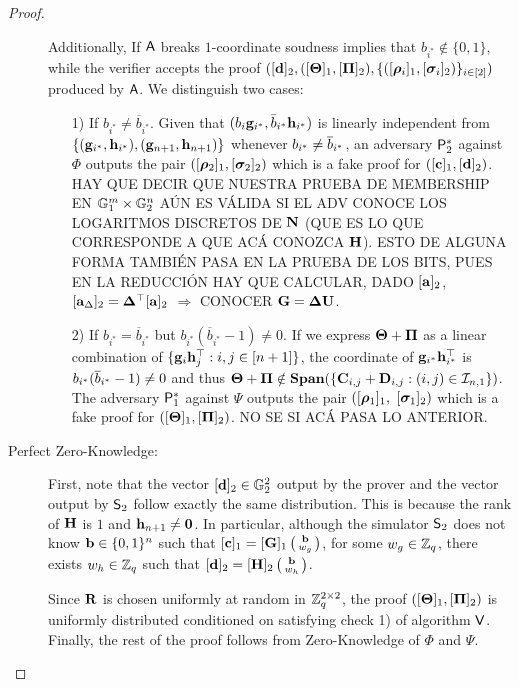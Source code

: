 \begin{proof}
\begin{description}
Additionally, If $\mathsf{A}$ breaks $1$-coordinate soudness implies that $b_{i^*} \notin \{0,1\}$,
while the verifier accepts the proof
$ (
        [\mathbf{d}]_2,
        ([\mathbf{{\Theta}}]_1, [\mathbf{{\Pi}}]_2), 
        \{([{\boldsymbol \rho}_{i}]_1, [{\boldsymbol \sigma}_{i}]_2)\}_{i \in [2]} )$
  produced by $\mathsf{A}$.
We distinguish two cases:
\begin{itemize}
\item[1)] If $b_{i^*} \neq \overline{b}_{i^*}$. Given that $(b_{i}\mathbf{g}_{i^*},\bar{b}_{i^*}\mathbf{h}_{i^*})$ is linearly independent from $\{(\mathbf{g}_{i^*},\mathbf{h}_{i^*}),(\mathbf{g}_{n+1},\mathbf{h}_{n+1})\}$
whenever $b_{i^*}\neq\overline{b}_{i^*}$, an adversary
$\mathsf{P}^*_2$ against $\Phi$
outputs the pair $([{\boldsymbol \rho}_{2}]_1,[{\boldsymbol \sigma}_{2}]_2)
$ which is a fake proof for 
$([\mathbf{c}]_1,[\mathbf{d}]_2)$.
{\color{red} HAY QUE DECIR QUE NUESTRA PRUEBA DE MEMBERSHIP EN $\mathbb{G}_1^m\times\mathbb{G}_2^n$ A\'UN ES V\'ALIDA SI EL ADV CONOCE LOS LOGARITMOS DISCRETOS DE $\mathbf{{N}}$ (QUE ES LO QUE CORRESPONDE A QUE AC\'A CONOZCA $\mathbf{{H}}$). ESTO DE ALGUNA FORMA TAMBI\'EN PASA EN LA PRUEBA DE LOS BITS, PUES EN LA REDUCCI\'ON HAY QUE CALCULAR, DADO $[\mathbf{a}]_2$, $[\mathbf{a}_\Delta]_2=\mathbf{{\Delta}}^\top[\mathbf{a}]_2$ $\Rightarrow$ CONOCER $\mathbf{{G}}=\mathbf{{\Delta}}\mathbf{{U}}$.}
\item[2)] If $b_{i^*} = \overline{b}_{i^*}$ but 
$b_{i^*}(\overline{b}_{i^*} -1) \neq 0$.
If we express $\mathbf{{\Theta}}+\mathbf{{\Pi}}$
as a linear combination of $\{\mathbf{g}_{i}\mathbf{h}_{j}^{\top}:i,j\in[n+1]\}$, the coordinate of
$\mathbf{g}_{i^*}\mathbf{h}_{i^*}^\top$ is $b_{i^*}(\overline{b}_{i^*}-1)\neq 0$ and thus $\mathbf{{\Theta}}+\mathbf{{\Pi}}\notin\mathbf{Span}(\{\mathbf{{C}}_{i,j}+\mathbf{{D}}_{i,j}:(i,j)\in\mathcal{I}_{n,1}\})$.
The adversary $\mathsf{P}^*_1$ against $\Psi$  outputs the pair
$([{\boldsymbol \rho}_1]_1,$ $[{\boldsymbol \sigma}_1]_2)$
which is a fake proof for $([\mathbf{{\Theta}}]_1, [\mathbf{{\Pi}}]_2)$.
{\color{red} NO SE SI AC\'A PASA LO ANTERIOR.}
\end{itemize}
\item[Perfect Zero-Knowledge:] First, note that the vector $[\mathbf{d}]_2 \in \mathbb{G}_2^2$ output by the prover and the vector output by $\mathsf{S}_2$ follow exactly the same distribution. This is because the rank of $\mathbf{{H}}$ is $1$ and $\mathbf{h}_{n+1}\neq \mathbf{0}$. In particular, although the simulator $\mathsf{S}_2$ does not know $\mathbf{b} \in \{0,1\}^{n}$ such that $[\mathbf{c}]_1=[\mathbf{{G}}]_1\left(\begin{smallmatrix}\mathbf{b}\\w_g\end{smallmatrix}\right)$, for some $w_g\in\mathbb{Z}_q$, 
there exists $w_h \in \mathbb{Z}_q$ such that $[\mathbf{d}]_2=[\mathbf{{H}}]_2\left(\begin{smallmatrix}\mathbf{b}\\ w_h\end{smallmatrix}\right)$. 

Since $\mathbf{{R}}$ is chosen uniformly at random in $\mathbb{Z}_q^{2 \times 2}$, the proof $([\mathbf{{\Theta}}]_1, [\mathbf{{\Pi}}]_2)$ is uniformly distributed conditioned on satisfying check 1) of algorithm $\mathsf{V}$.
 Finally, the rest of the proof follows from Zero-Knowledge of $\Phi$ and $\Psi$.
\end{description}
\end{proof}
